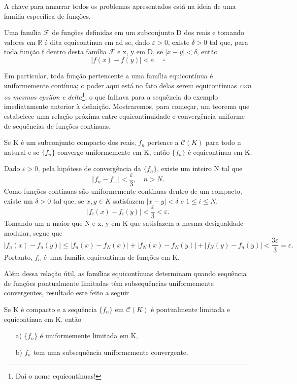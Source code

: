 \documentclass[../analysis_notes.tex]{subfiles}
\begin{document}
A chave para amarrar todos os problemas apresentados está na ideia de uma família específica de funções,
\begin{def*}
	Uma família \(\mathcal{F}\) de funções definidas em um subconjunto D dos reais e tomando valores em \(\mathbb{R}\) é dita equicontínua em ad se, dado \(\varepsilon > 0\), existe \(\delta >0\) tal que, para toda função f dentro desta família \(\mathcal{F}\) e x, y em D, se \(|x-y|<\delta \), então
	\[
		|f(x)-f(y)|<\varepsilon .\quad \square
	\]
\end{def*}
Em particular, toda função pertencente a uma família equicontínua é uniformemente contínua; o poder aqui está no fato delas serem equicontínuas \textit{com os mesmos epsilon e delta}\footnote{Daí o nome equicontínuas!}, o que falhava para a sequência do exemplo imediatamente anterior à definição. Mostraremos, para começar, um teorema que estabelece uma relação próxima entre equicontinuidade e convergência uniforme de sequências de funções contínuas.
\begin{theorem*}
	Se K é um subconjunto compacto dos reais, \(f_{n}\) pertence a \(\mathcal{C}(K)\) para todo n natural e se \(\{f_{n}\}\) converge uniformemente em K, então \(\{f_{n}\}\) é equicontínua em K.
\end{theorem*}
\begin{proof*}
	Dado \(\varepsilon >0\), pela hipótese de convergência da \(\{f_{n}\}\), existe um inteiro N tal que
	\[
		\Vert f_{n}-f_{-} \Vert < \frac{\varepsilon }{3},\quad n>N.
	\]
	Como funções contínuas são uniformemente contínuas dentro de um compacto, existe um \(\delta >0\) tal que, se \(x, y\in K\) satisfazem \(|x-y|<\delta \) e \(1\leq i\leq N\),
	\[
		|f_{i}(x)-f_{i}(y)| < \frac{\varepsilon }{3}<\varepsilon .
	\]
	Tomando um n maior que N e x, y em K que satisfazem a mesma desigualdade modular, segue que
	\[
		|f_{n}(x)-f_{n}(y)|\leq |f_{n}(x)-f_{N}(x)|+|f_{N}(x)-f_{N}(y)|+|f_{N}(y)-f_{n}(y)| < \frac{3\varepsilon }{3}=\varepsilon .
	\]
	Portanto, \(f_{n}\) é uma família equicontínua de funções em K. \qedsymbol
\end{proof*}
Além dessa relação útil, as famílias equicontínuas determinam quando sequência de funções pontualmente limitadas têm subsequências uniformemente convergentes, resultado este feito a seguir
\begin{theorem*}
	Se K é compacto e a sequência \(\{f_{n}\}\) em \(\mathcal{C}(K)\) é pontualmente limitada e equicontínua em K, então
	\begin{itemize}
		\item[a)] \(\{f_{n}\}\) é uniformemente limitada em K,
		\item[b)] \(f_{n}\) tem uma subsequência uniformemente convergente.
	\end{itemize}
\end{theorem*}
\end{document}
